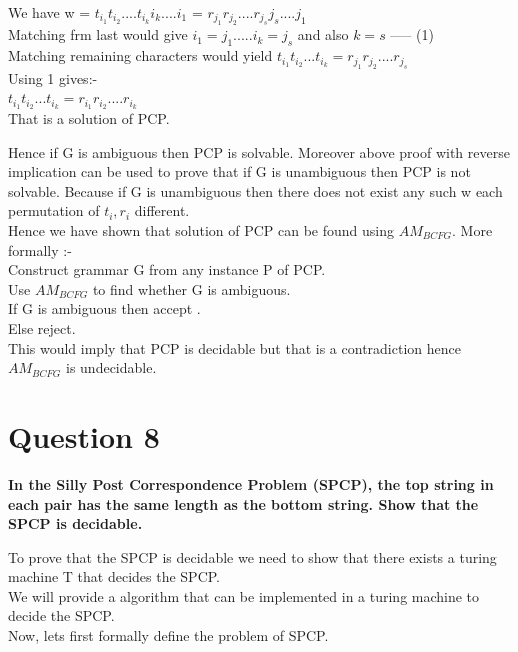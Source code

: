 \documentclass{article}
\begin{document}
\begin{enumerate}
    We have w = $t_{i_1}t_{i_2}....t_{i_k}i_k....i_1$ = $r_{j_1}r_{j_2}....r_{j_s}j_s....j_1$\\
    Matching frm last would give $i_1 = j_1 ..... i_k = j_s$ and also $k=s$ ----- (1)\\
    Matching remaining characters would yield $t_{i_1}t_{i_2}...t_{i_k} = r_{j_1}r_{j_2}....r_{j_s}$\\
    Using 1 gives:- \\
    $t_{i_1}t_{i_2}...t_{i_k} = r_{i_1}r_{i_2}....r_{i_k}$\\
    That is a solution of PCP.\\
\end{enumerate}
Hence if G is ambiguous then PCP is solvable. Moreover above proof with reverse implication can be used to prove that if G is unambiguous then PCP is not solvable. Because 
if G is unambiguous then there does not exist any such w each permutation of $t_i , r_i$ different.\\

Hence we have shown that solution of PCP can be found using $AM_{BCFG}$. More formally :- \\
Construct grammar G from any instance P of PCP.\\
Use $AM_{BCFG}$ to find whether G is ambiguous.\\
If G is ambiguous then accept .\\
Else reject.\\

This would imply that PCP is decidable but that is a contradiction hence $AM_{BCFG}$ is undecidable.\\

\pagebreak


\section{Question 8}
\textbf{In the Silly Post Correspondence Problem (SPCP), the top string in each pair has the same
length as the bottom string. Show that the SPCP is decidable.\\}

To prove that the SPCP is decidable we need to show that there exists a turing machine T that decides the SPCP.\\
We will provide a algorithm that can be implemented in a turing machine to decide the SPCP.\\

Now, lets first formally define the problem of SPCP.\\
\end{document}
